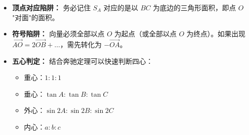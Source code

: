\begin{trapbox}
\begin{itemize}
    \item \textbf{顶点对应陷阱：} 务必记住 $S_A$ 对应的是以 $BC$ 为底边的三角形面积，即点 $O$ "对面"的面积。
    \item \textbf{符号陷阱：} 向量必须全部以点 $O$ 为起点（或全部以点 $O$ 为终点）。如果出现 $\vec{AO} = 2\vec{OB} + \dots$，需先转化为 $-\vec{OA}$。
    \item \textbf{五心判定：} 结合奔驰定理可以快速判断四心：
    \begin{itemize}
        \item 重心：$1:1:1$
        \item 垂心：$\tan A : \tan B : \tan C$
        \item 外心：$\sin 2A : \sin 2B : \sin 2C$
        \item 内心：$a : b : c$
    \end{itemize}
\end{itemize}
\end{trapbox}